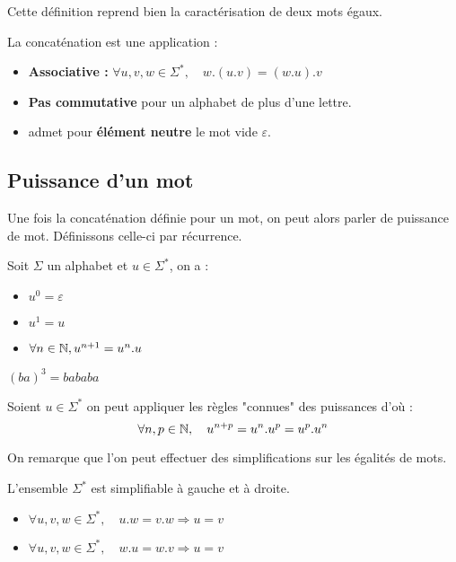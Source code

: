 \begin{remark}
    Cette définition reprend bien la caractérisation de deux mots égaux. 
\end{remark}

\begin{proposition}
    La concaténation est une application :
    \begin{itemize}
        \item \textbf{Associative : } $\forall u,v,w \in \Sigma^*, \quad w.(u.v) = (w.u).v$ 
        \item \textbf{Pas commutative} pour un alphabet de plus d'une lettre. 
        \item admet pour \textbf{élément neutre} le mot vide $\varepsilon$. 
    \end{itemize}
\end{proposition}

\subsection{Puissance d'un mot}

Une fois la concaténation définie pour un mot, on peut alors parler de puissance de mot. 
Définissons celle-ci par récurrence. 

\begin{definition}
    Soit $\Sigma$ un alphabet et $ u \in \Sigma^*$, on a :
    \begin{itemize}
        \item $u^0 = \varepsilon $
        \item $u^1 = u$ 
        \item $ \forall n \in \mathbb{N}, u^{n+1} = u^n.u$ 
    \end{itemize}
\end{definition}

\begin{example}
    $(ba)^3 = bababa $
\end{example}

\begin{proposition}
    Soient $u \in \Sigma^*$ on peut appliquer les règles "connues" des puissances d'où : $$ \forall n,p \in \mathbb{N}, \quad  u^{n+p} = u^n . u^p = u^p . u^n $$ 
\end{proposition}

On remarque que l'on peut effectuer des simplifications sur les égalités de mots. 

\begin{prop}[Simplifications]
    L'ensemble $\Sigma^*$ est simplifiable à gauche et à droite. 
    \begin{itemize}
        \item $\forall u,v,w \in \Sigma^*, \quad u.w = v.w \Longrightarrow u = v $
        \item $\forall u,v,w \in \Sigma^*, \quad w.u = w.v \Longrightarrow u = v $
    \end{itemize}
\end{prop}

